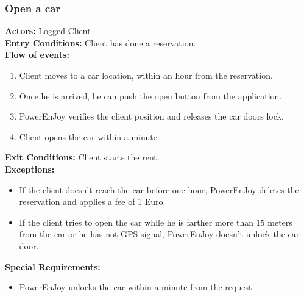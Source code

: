 \subsubsection{Open a car}
%
\textbf{Actors:}
Logged Client \\
%
\textbf{Entry Conditions:}
Client has done a reservation. \\
%
\textbf{Flow of events:}
\begin{enumerate}
\item Client moves to a car location, within an hour from the reservation.
\item Once he is arrived, he can push the open button from the application.
\item PowerEnJoy verifies the client position and releases the car doors lock.
\item Client opens the car within a minute.
\end{enumerate}
%
\textbf{Exit Conditions:}
Client starts the rent. \\
%
\textbf{Exceptions:}
\begin{itemize}
\item If the client doesn't reach the car before one hour, PowerEnJoy deletes the reservation and applies a fee of 1 Euro.
\item If the client tries to open the car while he is farther more than 15 meters from the car or he has not GPS signal, PowerEnJoy doesn't unlock the car door.
\end{itemize}
%
\textbf{Special Requirements:}
\begin{itemize}
\item PowerEnJoy unlocks the car within a minute from the request.
\end{itemize}



